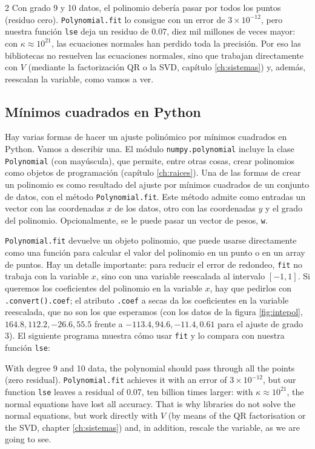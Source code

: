\begin{paracol}{2}
Con grado 9 y 10 datos, el polinomio debería pasar por todos los puntos (residuo cero). \texttt{Polynomial.fit} lo consigue con un error de $3\times10^{-12}$, pero nuestra función \texttt{lse} deja un residuo de 0.07, diez mil millones de veces mayor: con $\kappa\approx 10^{21}$, las ecuaciones normales han perdido toda la precisión. Por eso las bibliotecas no resuelven las ecuaciones normales, sino que trabajan directamente con $V$ (mediante la factorización QR o la SVD, capítulo \ref{ch:sistemas}) y, además, reescalan la variable, como vamos a ver.

\subsection{Mínimos cuadrados en Python}

Hay varias formas de hacer un ajuste polinómico por mínimos cuadrados en Python. Vamos a describir una. El módulo \texttt{numpy.polynomial} incluye la clase \texttt{Polynomial} (con mayúscula), que permite, entre otras cosas, crear polinomios como objetos de programación (capítulo \ref{ch:raices}). Una de las formas de crear un polinomio es como resultado del ajuste por mínimos cuadrados de un conjunto de datos, con el método \texttt{Polynomial.fit}. Este método admite como entradas un vector con las coordenadas $x$ de los datos, otro con las coordenadas $y$ y el grado del polinomio. Opcionalmente, se le puede pasar un vector de pesos, \texttt{w}.

\texttt{Polynomial.fit} devuelve un objeto polinomio, que puede usarse directamente como una función para calcular el valor del polinomio en un punto o en un array de puntos. Hay un detalle importante: para reducir el error de redondeo, \texttt{fit} no trabaja con la variable $x$, sino con una variable reescalada al intervalo $[-1,1]$. Si queremos los coeficientes del polinomio en la variable $x$, hay que pedirlos con \texttt{.convert().coef}; el atributo \texttt{.coef} a secas da los coeficientes en la variable reescalada, que no son los que esperamos (con los datos de la figura \ref{fig:intepol}, $164.8, 112.2, -26.6, 55.5$ frente a $-113.4, 94.6, -11.4, 0.61$ para el ajuste de grado 3). El siguiente programa muestra cómo usar \texttt{fit} y lo compara con nuestra función \texttt{lse}:

\switchcolumn
With degree 9 and 10 data, the polynomial should pass through all the points (zero residual). \texttt{Polynomial.fit} achieves it with an error of $3\times10^{-12}$, but our function \texttt{lse} leaves a residual of 0.07, ten billion times larger: with $\kappa\approx 10^{21}$, the normal equations have lost all accuracy. That is why libraries do not solve the normal equations, but work directly with $V$ (by means of the QR factorisation or the SVD, chapter \ref{ch:sistemas}) and, in addition, rescale the variable, as we are going to see.


\end{paracol}
